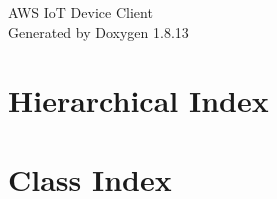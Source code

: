 \documentclass[twoside]{book}
\newcommand{\+}{\discretionary{\mbox{\scriptsize$\hookleftarrow$}}{}{}}
\newcommand{\clearemptydoublepage}{%
  \newpage{\pagestyle{empty}\cleardoublepage}%
}
\begin{document}
\hypersetup{pageanchor=false,
             bookmarksnumbered=true,
             pdfencoding=unicode
            }
\begin{titlepage}
\vspace*{7cm}
\begin{center}%
{\Large A\+WS IoT Device Client }\\
\vspace*{1cm}
{\large Generated by Doxygen 1.8.13}\\
\end{center}
\end{titlepage}
\clearemptydoublepage
{}
\tableofcontents
\clearemptydoublepage
{}
\hypersetup{pageanchor=true}

\chapter{Hierarchical Index}

\chapter{Class Index}

\end{document}
